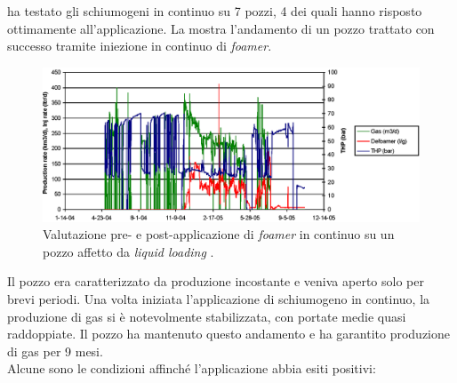 \textcite{wittfeld2015foam} ha testato gli schiumogeni in continuo su 7 pozzi, 4 dei quali hanno risposto ottimamente all'applicazione. La  mostra l'andamento di un pozzo trattato con successo tramite iniezione in continuo di \textit{foamer}. 
\begin{figure}[htbp]
    \centering
    \includegraphics[width=\textwidth]{fig/foamer/continuous-evaluation.eps}
    \caption{Valutazione pre- e post-applicazione di \textit{foamer} in continuo su un pozzo affetto da \textit{liquid loading} \parencite{wittfeld2015foam}.}
    \label{fig:continuous-evaluation}
\end{figure}
Il pozzo era caratterizzato da produzione incostante e veniva aperto solo per brevi periodi. Una volta iniziata l'applicazione di schiumogeno in continuo, la produzione di gas si è notevolmente stabilizzata, con portate medie quasi raddoppiate. Il pozzo ha mantenuto questo andamento e ha garantito produzione di gas per 9 mesi.\\
Alcune sono le condizioni affinché l'applicazione abbia esiti positivi:
